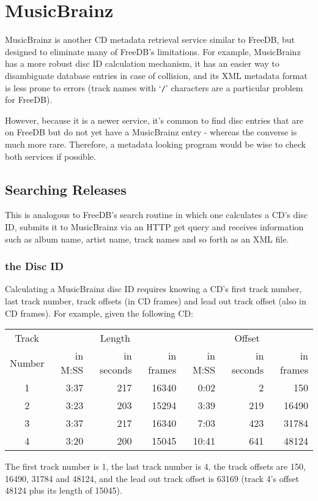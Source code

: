 
\chapter{MusicBrainz}
MusicBrainz is another CD metadata retrieval service similar to FreeDB,
but designed to eliminate many of FreeDB's limitations.
For example, MusicBrainz has a more robust disc ID calculation mechanism,
it has an easier way to disambiguate database entries in case of collision,
and its XML metadata format is less prone to errors
(track names with `\texttt{/}' characters are a particular problem for
FreeDB).

However, because it is a newer service, it's common to find disc entries
that are on FreeDB but do not yet have a MusicBrainz entry - whereas
the converse is much more rare.
Therefore, a metadata looking program would be wise to check both
services if possible.

\section{Searching Releases}
This is analogous to FreeDB's search routine in which one calculates
a CD's disc ID, submits it to MusicBrainz via an HTTP get query
and receives information such as album name, artist name, track names
and so forth as an XML file.

\clearpage

\subsection{the Disc ID}
Calculating a MusicBrainz disc ID requires knowing a CD's first track number,
last track number, track offsets (in CD frames) and lead out track offset
(also in CD frames).
For example, given the following CD:
\begin{table}[h]
\begin{tabular}{|c||r|r|r||r|r|r|}
\hline
Track & \multicolumn{3}{c||}{Length} & \multicolumn{3}{c|}{Offset} \\
Number & in M:SS & in seconds & in frames & in M:SS & in seconds & in frames \\
\hline
1 & 3:37 & 217 & 16340 & 0:02 & 2 & 150 \\
2 & 3:23 & 203 & 15294 & 3:39 & 219 & 16490 \\
3 & 3:37 & 217 & 16340 & 7:03 & 423 & 31784 \\
4 & 3:20 & 200 & 15045 & 10:41 & 641 & 48124 \\
\hline
\end{tabular}
\end{table}
\par
\noindent
The first track number is 1, the last track number is 4, the track offsets
are 150, 16490, 31784 and 48124, and the lead out track offset is
63169 (track 4's offset 48124 plus its length of 15045).

